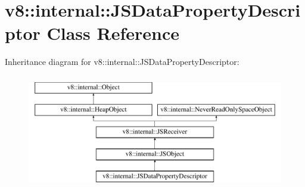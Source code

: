 \hypertarget{classv8_1_1internal_1_1JSDataPropertyDescriptor}{}\section{v8\+:\+:internal\+:\+:J\+S\+Data\+Property\+Descriptor Class Reference}
\label{classv8_1_1internal_1_1JSDataPropertyDescriptor}
Inheritance diagram for v8\+:\+:internal\+:\+:J\+S\+Data\+Property\+Descriptor\+:\begin{figure}[H]
\begin{center}
\leavevmode
\includegraphics[height=5.000000cm]{classv8_1_1internal_1_1JSDataPropertyDescriptor}
\end{center}
\end{figure}
